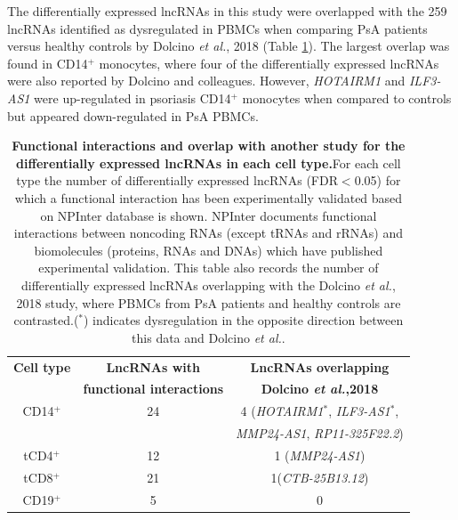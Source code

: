 The differentially expressed lncRNAs in this study were overlapped with the 259 lncRNAs identified as dysregulated in PBMCs when comparing PsA patients versus healthy controls by Dolcino \textit{et al.}, 2018 (Table \ref{tab:RNAseq_PS_CTL_lncRNAs_annotation}). The largest overlap was found in CD14$^+$ monocytes, where four of the differentially expressed lncRNAs were also reported by Dolcino and colleagues. However, \textit{HOTAIRM1} and \textit{ILF3-AS1} were up-regulated in psoriasis CD14$^+$ monocytes when compared to controls but appeared down-regulated in PsA PBMCs. 


\begin{table}[htbp]
\centering
\begin{tabular}{@{} c c c}
\toprule
\textbf{Cell type}   & \textbf{LncRNAs with}             &\textbf{LncRNAs overlapping}  \\
                     & \textbf{functional interactions}  &\textbf{Dolcino \textit{et al.},2018}   \\
\midrule
\midrule
CD14$^+$             & 24  & 4 (\textit{HOTAIRM1}$^{\ast}$, \textit{ILF3-AS1}$^{\ast}$, \\
                     &     & \textit{MMP24-AS1}, \textit{RP11-325F22.2})\\                 
tCD4$^+$             & 12  & 1 (\textit{MMP24-AS1}) \\
tCD8$^+$             & 21  & 1(\textit{CTB-25B13.12})\\
CD19$^+$             & 5   & 0\\
\bottomrule 
\end{tabular}
\medskip %
\caption[Functional interactions and overlap with another study for the differentially expressed lncRNAs in each cell type.]{\textbf{Functional interactions and overlap with another study for the differentially expressed lncRNAs in each cell type.}For each cell type the number of differentially expressed lncRNAs (FDR$<$0.05) for which a functional interaction has been experimentally validated based on NPInter database is shown. NPInter documents functional interactions between noncoding RNAs (except tRNAs and rRNAs) and biomolecules (proteins, RNAs and DNAs) which have published experimental validation. This table also records the number of differentially expressed lncRNAs overlapping with the Dolcino \textit{et al.}, 2018 study, where PBMCs from PsA patients and healthy controls are contrasted.($^{\ast}$) indicates dysregulation in the opposite direction between this data and Dolcino \textit{et al.}.}
\label{tab:RNAseq_PS_CTL_lncRNAs_annotation}
\end{table}
\bigskip %

